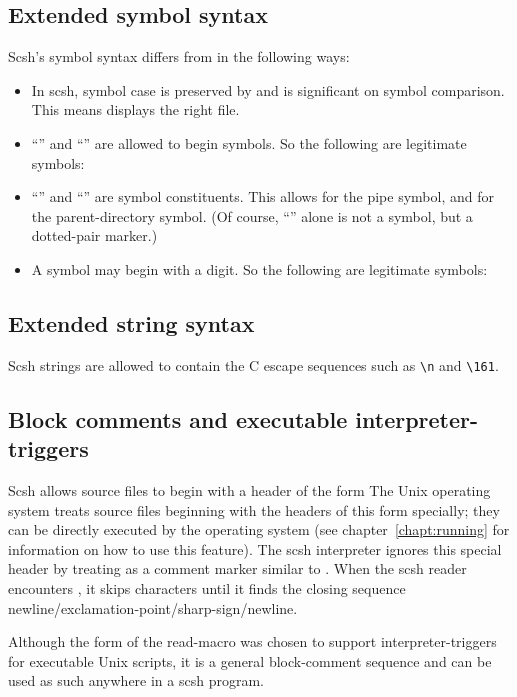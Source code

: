 \subsection{Extended symbol syntax}
Scsh's symbol syntax differs from {\RnRS} {\Scheme} in the following ways:
\begin{itemize}
\item In scsh, symbol case is preserved by  and is significant on
      symbol comparison. This means 
      displays the right file.

\item ``\ex{-}'' and ``\ex{+}'' are allowed to begin symbols. 
      So the following are legitimate symbols:

\item ``\ex{|}'' and ``'' are symbol constituents.
  This allows \ex{|} for the pipe symbol, and  for the parent-directory
  symbol. (Of course, ``'' alone is not a symbol, but a 
  dotted-pair marker.)

\item A symbol may begin with a digit.
      So the following are legitimate symbols:
\end{itemize}

\subsection{Extended string syntax}
Scsh strings are allowed to contain the {\Ansi} C escape sequences
      such as \verb|\n| and \verb|\161|.
        
\subsection{Block comments and executable interpreter-triggers}
Scsh allows source files to begin with a header of the form
The Unix operating system treats source files beginning with the headers
of this form specially; 
they can be directly executed by the operating system
(see chapter~\ref{chapt:running} for information on how to use this feature).
The scsh interpreter ignores this special header by treating \ex{\#!} as a
comment marker similar to \ex{;}. 
When the scsh reader encounters \ex{\#!}, it skips characters until it finds
the closing sequence
new\-line/{\ob}ex\-cla\-ma\-tion-{\ob}point/{\ob}sharp-{\ob}sign/{\ob}new\-line.

Although the form of the \ex{\#!} read-macro was chosen to support
interpreter-triggers for executable Unix scripts,
it is a general block-comment sequence and can be used as such
anywhere in a scsh program.


